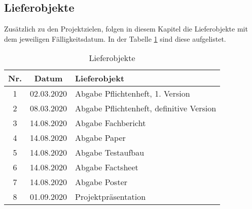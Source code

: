 \subsection{Lieferobjekte}\label{subsec:Lieferobjekte}
Zusätzlich zu den Projektzielen, folgen in diesem Kapitel die Lieferobjekte  mit dem jeweiligen Fälligkeitsdatum. In der Tabelle \ref{tbl:Lieferobjekte} sind diese  aufgelistet.  


\begin{table}[H]
     \centering
\begin{tabular}{|c|c|l|}\hline
   \textbf{Nr.} & \textbf{Datum} & \textbf{Lieferobjekt} \\ \hline
   
   1 & 02.03.2020 & Abgabe Pflichtenheft, 1. Version\\ \hline
   2 & 08.03.2020 & Abgabe Pflichtenheft, definitive Version\\ \hline
   3 & 14.08.2020 & Abgabe Fachbericht \\ \hline
   4 & 14.08.2020 & Abgabe Paper \\ \hline
   5 & 14.08.2020 & Abgabe Testaufbau \\ \hline
   6 & 14.08.2020 & Abgabe Factsheet \\ \hline
   7 & 14.08.2020 & Abgabe Poster \\ \hline
   8 & 01.09.2020 & Projektpräsentation \\ \hline
   
 \end{tabular}
     \caption{Lieferobjekte}
     \label{tbl:Lieferobjekte}
\end{table}